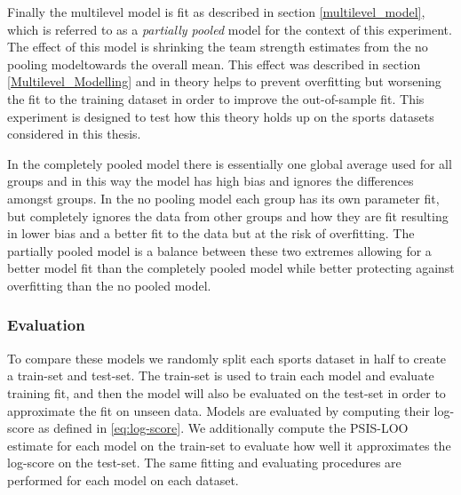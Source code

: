 Finally the multilevel model is fit as described in section \ref{multilevel_model}, which is referred to as a \textit{partially pooled} model for the context of this experiment. The effect of this model is shrinking the team strength estimates from the no pooling modeltowards the overall mean. This effect was described in section \ref{Multilevel_Modelling} and in theory helps to prevent overfitting but worsening the fit to the training dataset in order to improve the out-of-sample fit. This experiment is designed to test how this theory holds up on the sports datasets considered in this thesis.

In the completely pooled model there is essentially one global average used for all groups and in this way the model has high bias and ignores the differences amongst groups. In the no pooling model each group has its own parameter fit, but completely ignores the data from other groups and how they are fit resulting in lower bias and a better fit to the data but at the risk of overfitting. The partially pooled model is a balance between these two extremes allowing for a better model fit than the completely pooled model while better protecting against overfitting than the no pooled model.

\subsubsection*{Evaluation}

To compare these models we randomly split each sports dataset in half to create a train-set and test-set. The train-set is used to train each model and evaluate training fit, and then the model will also be evaluated on the test-set in order to approximate the fit on unseen data. Models are evaluated by computing their log-score as defined in \ref{eq:log-score}. We additionally compute the PSIS-LOO estimate for each model on the train-set to evaluate how well it approximates the log-score on the test-set. The same fitting and evaluating procedures are performed for each model on each dataset.

